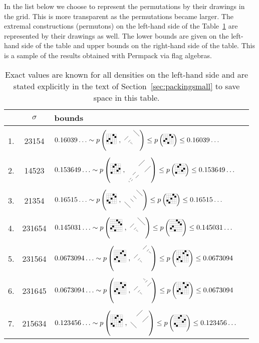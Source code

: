 \documentclass[12pt, a4paper, twoside]{report}
\begin{document}
In the list below we choose to represent the permutations by their drawings in the grid. This is more transparent as the permutations became larger. The extremal constructions (permutons) on the left-hand side of the Table~\ref{tab:otherperms} are represented by their drawings as well. The lower bounds are given on the left-hand side of the table and upper bounds on the right-hand side of the table. This is a sample of the results obtained with Permpack via flag algebras.
\begin{table}[ht]
  \centering
  \begin{tabular}{c | c l c}
    &$\sigma$ & bounds \\
    \hline\\[-2pt]
    1. & 23154 & $0.16039\ldots \sim p\left(\bcaoba\ ,\ \Amax\right) \leq p\left(\bcaoba\right) \leq 0.16039\ldots$\\
    \\[-2pt]
    2. & 14523 & $0.153649\ldots \sim p\left(\aobamba\ ,\ \Bmax\right) \leq p\left(\aobamba\right) \leq 0.153649\ldots$\\
    \\[-2pt]
    3. & 21354 & $0.16515\ldots \sim p\left(\baoaoba\ ,\ \Cmax\right) \leq p\left(\baoaoba\right) \leq 0.16515\ldots$\\
    \\[-2pt]
    4. & 231654 & $0.145031\ldots \sim p\left(\bcaocba\ ,\ \AAmax\right) \leq p\left(\bcaocba\right) \leq 0.145031\ldots$\\
    \\[-2pt]
    5. & 231564 & $0.0673094\ldots \sim p\left(\bcaobca\ ,\ \Dmax\right) \leq p\left(\bcaobca\right) \leq 0.0673094$\\
    \\[-2pt]
    6. & 231645 & $0.0673094\ldots \sim p\left(\bcaocab\ ,\ \Dmaxr\right) \leq p\left(\bcaocab\right) \leq 0.0673094$\\
    \\[-2pt]
    7. & 215634 & $0.123456\ldots \sim p\left(\baoabmab\ ,\ \Emax\right) \leq p\left(\baoabmab\right) \leq 0.123456\ldots$
\end{tabular}
\caption{\small Exact values are known for all densities on the left-hand side and are stated explicitly in the text of Section~\ref{sec:packingsmall} to save space in this table.}
\label{tab:otherperms}
\end{table}
\end{document}

